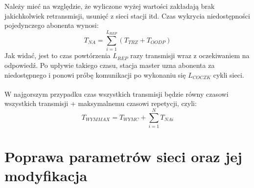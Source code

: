 	Należy mieć na względzie, że wyliczone wyżej wartości zakładają brak jakichkolwiek retransmisji, usunięć z sieci stacji itd. Czas wykrycia niedostępności pojedynczego abonenta wynosi:
	\begin{equation}
		\label{eq:czasNiedost}
		T_{NA} = \sum\limits_{i=1}^{L_{REP}}(T_{TRZ} + T_{OODP})
	\end{equation}
	Jak widać, jest to czas powtórzenia $ L_{REP} $ razy transmisji wraz z oczekiwaniem na odpowiedź. Po upływie takiego czasu, stacja master uzna abonenta za niedostępnego i ponowi próbę komunikacji po wykonaniu się $ L_{COCZK} $ cykli sieci.\\
	\\
	W najgorszym przypadku czas wszystkich transmisji będzie równy czasowi wszystkich transmisji + maksymalnemu czasowi repetycji, czyli:
	\begin{equation}
		\label{eq:czasMAX}
		T_{WYMMAX} = T_{WYMC} + \sum\limits_{i=1}^N T_{NAi}
	\end{equation}
\section{Poprawa parametrów sieci oraz jej modyfikacja}
